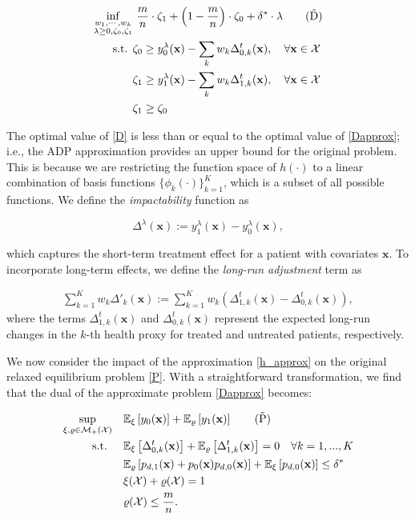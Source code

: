 \documentclass[12pt,a4paper]{article}
\newcommand{\bx}{\mathbf{x}}
\newcommand{\mMplusX}{\mathcal{M}_{+}(\mathcal{X})}
\begin{document}
\begin{align} 
	 \inf_{\substack{w_1,\cdots, w_k\\
     \lambda\geq 0,\zeta_0,\zeta_1}}  & \ 
	\frac{m}{n} \cdot \zeta_1+\left(1-\frac{m}{n}\right) \cdot \zeta_0+\delta^* \cdot \lambda  \label{Dapprox} \tag{$\tilde{\mbox{D}}$} \\ 
	\text { s.t. }
	& \zeta_0\geq y_0^\lambda(\bx)-\sum_k w_k \Delta_{0, k}^t(\bx), \quad \forall \bx \in \mathcal{X} \nonumber\\
	& \zeta_1\geq y_1^\lambda(\bx)-\sum_k w_k \Delta_{1, k}^t(\bx), \quad \forall \bx \in \mathcal{X} \nonumber \\
	& \zeta_1\geq \zeta_0 \nonumber 
\end{align}

The optimal value of \eqref{D} is less than or equal to the optimal value of \eqref{Dapprox}; i.e.,  the ADP approximation provides an upper bound for the original problem. This is because we are restricting the function space of $h(\cdot)$ to a linear combination of basis functions $\{\phi_k(\cdot)\}_{k=1}^K$, which is a subset of all possible functions. We define the {\it impactability} function as

\begin{equation} 
\Delta^\lambda(\bx) := y_1^\lambda(\bx) - y_0^\lambda(\bx), \label{Delta} %
\end{equation}

\noindent which captures the short-term treatment effect for a patient with covariates $\bx$. To incorporate long-term effects, we define the {\it long-run adjustment} term as

\begin{align} 
\label{Delta'} %
\sum_{k=1}^K w_k \Delta'_k(\bx) := \sum_{k=1}^K w_k \left( \Delta_{1,k}^t(\bx) - \Delta_{0,k}^t(\bx) \right),
\end{align}
where the terms $\Delta_{1,k}^t(\bx)$ and $\Delta_{0,k}^t(\bx)$ represent the expected long-run changes in the $k$-th health proxy for treated and untreated patients, respectively. 



We now consider the impact of the approximation \eqref{h_approx} on the original relaxed equilibrium problem \eqref{P}. With a straightforward transformation, we find that the dual of the approximate problem \eqref{Dapprox} becomes:

\begin{align} 
\sup_{\xi, \varrho\in \mMplusX} & \quad \mathbb{E}_{\xi}\left[y_0(\bx)\right]+\mathbb{E}_{\varrho}\left[y_1(\bx)\right] \label{Eapprox} \tag{$\tilde{\mbox{P}}$}\\ 
 \text { s.t. } & \quad \mathbb{E}_\xi\left[  \Delta_{0, k}^t(\bx)\right] +\mathbb{E}_\varrho\left[ \Delta_{1, k}^t(\bx)\right]=0 \quad \forall k=1,...,K \nonumber\\ 
	& \quad\mathbb{E}_{\varrho}\left[p_{d, 1}(\bx)+p_0(\bx)p_{d,0}(\bx)\right]+\mathbb{E}_{\xi}\left[p_{d, 0}(\bx)\right] \leq \delta^* \nonumber\\
	& \quad\xi(\mathcal{X})+\varrho(\mathcal{X})=1 \nonumber\\ 
	& \quad\varrho(\mathcal{X}) \leq \frac{m}{n}. \nonumber
\end{align}
\end{document}
